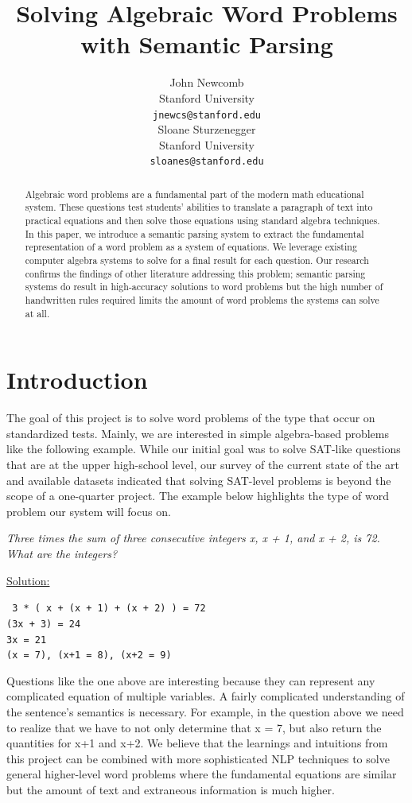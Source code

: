 \documentclass[11pt]{article}
\title{Solving Algebraic Word Problems with Semantic Parsing}
\author{John Newcomb \\
  Stanford University \\
  {\tt jnewcs@stanford.edu} \\\And
  Sloane Sturzenegger \\
  Stanford University \\
  {\tt sloanes@stanford.edu} \\}
\date{}
\begin{document}
\maketitle
\begin{abstract}
Algebraic word problems are a fundamental part of the modern math educational system. These questions test students’ abilities to translate a paragraph of text into practical equations and then solve those equations using standard algebra techniques. In this paper, we introduce a semantic parsing system to extract the fundamental representation of a word problem as a system of equations. We leverage existing computer algebra systems to solve for a final result for each question. Our research confirms the findings of other literature addressing this problem; semantic parsing systems do result in high-accuracy solutions to word problems but the high number of handwritten rules required limits the amount of word problems the systems can solve at all.
\end{abstract}

\section{Introduction}
The goal of this project is to solve word problems of the type that occur on standardized tests. Mainly, we are interested in simple algebra-based problems like the following example. While our initial goal was to solve SAT-like questions that are at the upper high-school level, our survey of the current state of the art and available datasets indicated that solving SAT-level problems is beyond the scope of a one-quarter project. The example below highlights the type of word problem our system will focus on.

\textit{Three times the sum of three consecutive integers x, x + 1, and x + 2, is 72. What are the integers?}

\underline{Solution:}
\begin{center}
    \small{\texttt{
        3 * ( x + (x + 1) + (x + 2) ) = 72\\
        (3x + 3) = 24\\
        3x = 21\\
        (x = 7), (x+1 = 8), (x+2 = 9)
    }}
\end{center}

Questions like the one above are interesting because they can represent any complicated equation of multiple variables. A fairly complicated understanding of the sentence’s semantics is necessary. For example, in the question above we need to realize that we have to not only determine that x = 7, but also return the quantities for x+1 and x+2. We believe that the learnings and intuitions from this project can be combined with more sophisticated NLP techniques to solve general higher-level word problems where the fundamental equations are similar but the amount of text and extraneous information is much higher.
\end{document}
